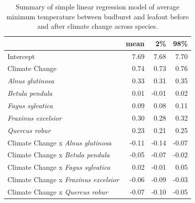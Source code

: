 \documentclass{article}\usepackage[]{graphicx}\usepackage[]{color}
\begin{document}
\begin{table}[H]
\centering
\caption{Summary of simple linear regression model of average minimum temperature between budburst and leafout before and after climate change across species.} 
\label{tab:simptmin}
\begin{tabular}{lrrr}
  \hline
 & mean & 2\% & 98\% \\ 
  \hline
Intercept & 7.69 & 7.68 & 7.70 \\ 
  Climate Change & 0.74 & 0.73 & 0.76 \\ 
  \textit{Alnus glutinosa} & 0.33 & 0.31 & 0.35 \\ 
  \textit{Betula pendula} & 0.01 & -0.01 & 0.02 \\ 
  \textit{Fagus sylvatica} & 0.09 & 0.08 & 0.11 \\ 
  \textit{Fraxinus excelsior} & 0.30 & 0.28 & 0.32 \\ 
  \textit{Quercus robur} & 0.23 & 0.21 & 0.25 \\ 
  Climate Change x \textit{Alnus glutinosa} & -0.11 & -0.14 & -0.07 \\ 
  Climate Change x \textit{Betula pendula} & -0.05 & -0.07 & -0.02 \\ 
  Climate Change x \textit{Fagus sylvatica} & 0.02 & -0.01 & 0.05 \\ 
  Climate Change x \textit{Fraxinus excelsior} & -0.06 & -0.09 & -0.03 \\ 
  Climate Change x \textit{Quercus robur} & -0.07 & -0.10 & -0.05 \\ 
   \hline
\end{tabular}
\end{table}
\end{document}
